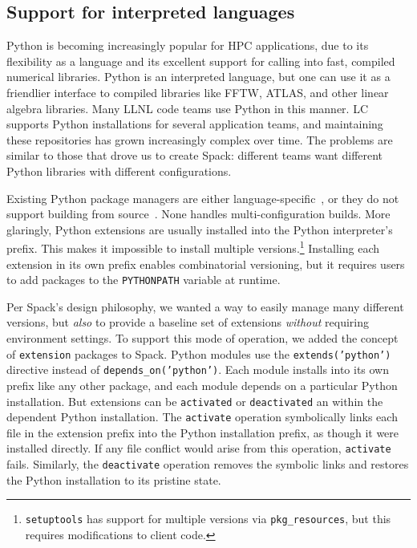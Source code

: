 
\subsection{Support for interpreted languages}
\label{sec:usecase-python}

Python is becoming increasingly popular for HPC applications, 
due to its flexibility as a language and its excellent support
for calling into fast, compiled numerical libraries.
Python is an interpreted language, but one can use it
as a friendlier interface to compiled libraries like FFTW, ATLAS, and
other linear algebra libraries.  Many LLNL code teams use Python in this manner.
%
LC supports Python installations for several application teams,
and maintaining these repositories has grown increasingly complex over
time. The problems are similar to those that drove us to create
Spack: different teams want different Python libraries with different
configurations.

Existing Python package managers are either language-specific~\cite{eby:setuptools}, 
or they do not support building from source~\cite{anaconda,conda}. None
handles multi-configuration builds.  More glaringly, Python extensions
are usually installed into the Python interpreter's prefix.
This makes it impossible to install multiple versions.\footnote{{\tt setuptools}
has support for multiple versions via {\tt pkg_resources}, 
but this requires modifications to client code.}
Installing each extension in its own prefix enables combinatorial versioning,
but it requires users to add packages to the {\tt PYTHONPATH} variable at runtime.

Per Spack's design philosophy, we wanted a way to easily manage many different
versions, but {\it also} to provide a baseline set of extensions {\it without}
requiring environment settings.
%
To support this mode of operation, we added the concept of {\tt extension} packages
to Spack. Python modules use the {\tt extends('python')} directive instead of
{\tt depends\_on('python')}.
Each module installs into its own prefix like any other package,
and each module depends on a particular Python installation.
But extensions can be {\tt activated} or {\tt deactivated} an
within the dependent Python installation.  The {\tt activate} operation
symbolically links each file in the extension prefix into the Python
installation prefix, as though it were installed directly. If any file
conflict would arise from this operation, {\tt activate} fails.
Similarly, the {\tt deactivate} operation removes the symbolic links and restores
the Python installation to its  pristine state. 

